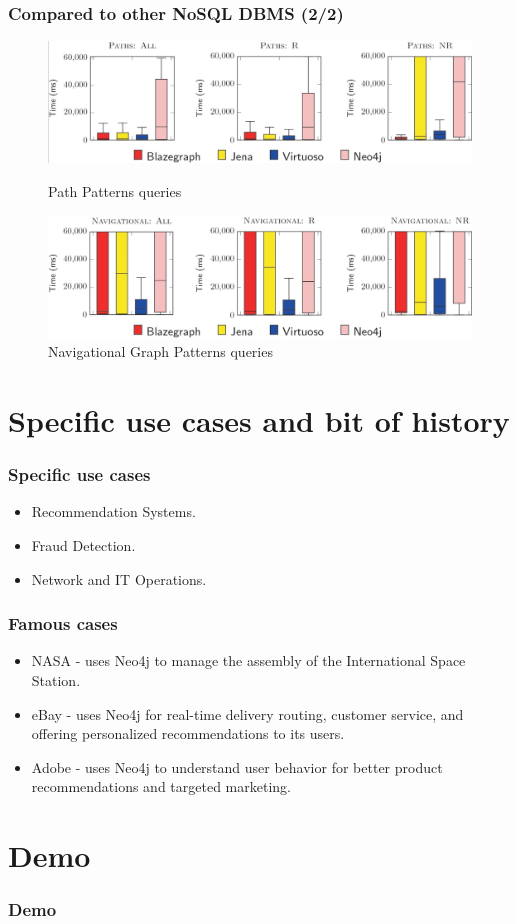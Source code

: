 \documentclass[aspectratio=169]{beamer}
\begin{document}
\begin{frame}
    \frametitle{Compared to other NoSQL DBMS (2/2)}

    \begin{figure}
        \begin{minipage}{0.48\textwidth}
            \centering
            \includegraphics[width=\linewidth]{benchWD3.png}
            \caption{Path Patterns queries}
            \label{fig:path}
        \end{minipage}\hfill
        \begin{minipage}{0.48\textwidth}
            \centering
            \includegraphics[width=\linewidth]{benchWD4.png}
            \caption{Navigational Graph Patterns queries}
            \label{fig:nav}
        \end{minipage}
    \end{figure}
    
\end{frame}


\section{Specific use cases and bit of history}

\begin{frame}
    \frametitle{Specific use cases}
	\begin{itemize}
		\item Recommendation Systems.
		\item Fraud Detection.
		\item Network and IT Operations.
	\end{itemize}
\end{frame}

\begin{frame}
    \frametitle{Famous cases}
	\begin{itemize}
		\item NASA - uses Neo4j to manage the assembly of the International Space Station.
		\item eBay - uses Neo4j for real-time delivery routing, customer service, and offering personalized recommendations to its users.
		\item Adobe - uses Neo4j to understand user behavior for better product recommendations and targeted marketing.
	\end{itemize}
\end{frame}

\section{Demo}

\begin{frame}
    \frametitle{Demo}
\end{frame}
\end{document}

